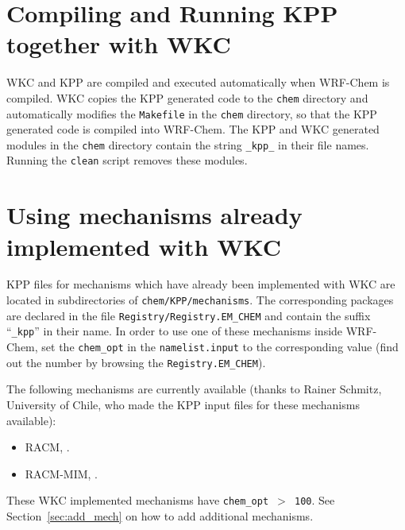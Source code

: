 \documentclass[twoside, 12pt, letterpaper]{article}
\begin{document}
\section{Compiling and Running KPP together with WKC}
WKC and KPP are compiled and executed automatically when WRF-Chem is compiled. WKC copies the KPP generated code to the {\tt chem} directory and automatically  modifies the {\tt Makefile} in the {\tt chem} directory, so that the KPP generated code is compiled into WRF-Chem. The KPP and WKC generated modules in the {\tt chem} directory contain the string {\tt \_kpp\_} in their file names. Running the {\tt clean} script removes these modules.   

\section{Using mechanisms already implemented with WKC}
KPP files for mechanisms which have already been implemented with WKC are located in subdirectories of {\tt chem/KPP/mechanisms}. The corresponding packages  are declared in the file {\tt Registry/Registry.EM\_CHEM} and contain the suffix ``{\tt \_kpp}'' in their name. In order to use one of these mechanisms inside WRF-Chem, set the {\tt chem\_opt} in the {\tt namelist.input} to the corresponding value (find out the number by browsing the {\tt Registry.EM\_CHEM}). 

\noindent The following mechanisms are currently available (thanks to Rainer Schmitz, University of Chile, who made the  KPP input files for these mechanisms available):
\begin{itemize}
\item RACM, \cite{sto97}.
\item RACM-MIM, \cite{gei03}.
\end{itemize} 

\noindent These WKC implemented mechanisms have {\tt chem\_opt $>$ 100}.
 See Section~\ref{sec:add_mech} on how to add additional mechanisms.
\end{document}
